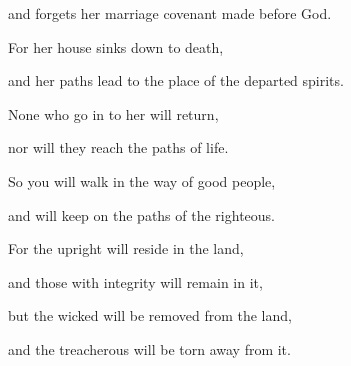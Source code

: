 {\par }{\Q and forgets
her marriage covenant
made before
God.
\par }{\Q {}For
her house
sinks down
to
death,
\par }{\Q and her paths
lead to
the place of the departed spirits.
\par }{\Q {}None
who go
in to her will return,
\par }{\Q nor
will they reach
the paths
of life.
\par }{\Q {}So
you will walk
in the way
of good
people,

\par }{\Q and will keep
on the paths
of the righteous.
\par }{\Q {}For
the upright
will reside
in the land,
\par }{\Q and those with integrity
will remain in it,
\par }{\Q {}but the wicked
will be removed
from the land,
\par }{\Q and the treacherous
will be torn away
from it.


}
